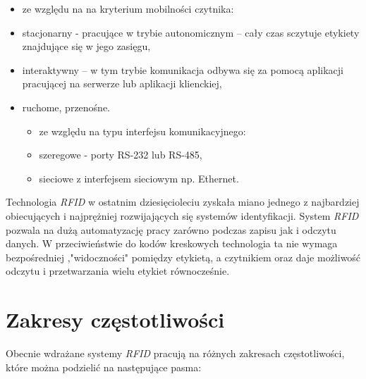 \begin{itemize}\setlength{\itemsep}{0pt}

	\item ze względu na na kryterium mobilności czytnika: 

	\item stacjonarny - pracujące w trybie autonomicznym – cały czas sczytuje etykiety znajdujące się w jego zasięgu, 

	\item interaktywny – w tym trybie komunikacja odbywa się za pomocą aplikacji pracującej na serwerze lub aplikacji klienckiej, 

	\item ruchome, przenośne.


	\begin{itemize}\setlength{\itemsep}{0pt}
		
		\item ze względu na typu interfejsu komunikacyjnego:

		\item szeregowe - porty RS-232 lub RS-485, 

		\item sieciowe z interfejsem sieciowym np. Ethernet.
	\end{itemize}
\end{itemize}

Technologia \emph{RFID} w ostatnim dziesięcioleciu zyskała miano jednego z najbardziej obiecujących i najprężniej rozwijających się systemów identyfikacji.
System \emph{RFID} pozwala na dużą automatyzację pracy zarówno podczas zapisu jak i odczytu danych. W przeciwieństwie do kodów kreskowych technologia ta nie wymaga bezpośredniej ,"widoczności" pomiędzy etykietą, a czytnikiem oraz daje możliwość odczytu i przetwarzania wielu etykiet równocześnie.


\section{Zakresy częstotliwości}

Obecnie wdrażane systemy \emph{RFID} pracują na różnych zakresach częstotliwości, które można podzielić na następujące pasma:

